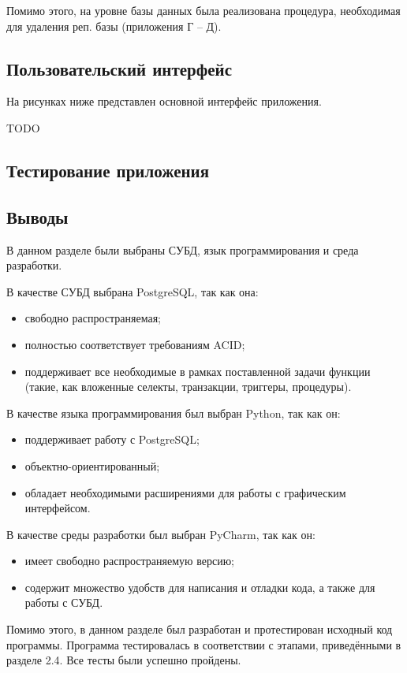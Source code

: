 Помимо этого, на уровне базы данных была реализована процедура, необходимая для удаления реп. базы (приложения Г – Д).

\subsection{Пользовательский интерфейс}

На рисунках ниже представлен основной интерфейс приложения.

TODO

\subsection{Тестирование приложения}

\subsection*{Выводы}

В данном разделе были выбраны СУБД, язык программирования и среда разработки.

В качестве СУБД выбрана PostgreSQL, так как она:
\begin{itemize}
	\item свободно распространяемая;
	\item полностью соответствует требованиям ACID;
	\item поддерживает все необходимые в рамках поставленной задачи функции (такие, как вложенные селекты, транзакции, триггеры, процедуры).
\end{itemize}

В качестве языка программирования был выбран Python, так как он:
\begin{itemize}
	\item поддерживает работу с PostgreSQL;
	\item объектно-ориентированный;
	\item обладает необходимыми расширениями для работы с графическим интерфейсом.
\end{itemize}

В качестве среды разработки был выбран PyCharm, так как он:
\begin{itemize}
	\item имеет свободно распространяемую версию;
	\item содержит множество удобств для написания и отладки кода, а также для работы с СУБД.
\end{itemize}

Помимо этого, в данном разделе был разработан и протестирован исходный код программы. Программа тестировалась в соответствии с этапами, приведёнными в разделе 2.4. Все тесты были успешно пройдены.
